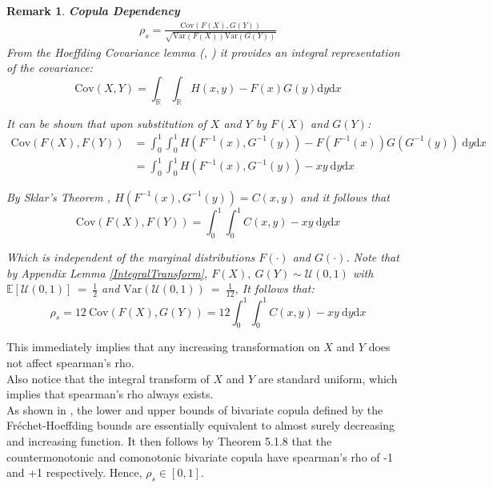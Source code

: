 \documentclass[12pt]{report}
\newtheorem{remark}{Remark}[section]
\newcommand{\1}{\mathbf{1}}
\begin{document}
\begin{remark}\label{SpearmanRhoCopulaDependency}\: \textbf{Copula Dependency}\\

\begin{align*}
\rho_{s} = \frac{\mathrm{Cov}(F(X),G(Y))}{\sqrt{\mathrm{Var}(F(X))\mathrm{Var}(G(Y))}}  
\end{align*}
From the Hoeffding Covariance lemma (\cite{höffding1940maßstabinvariante}, \cite{QRMMcNeil}) it provides an integral representation of the covariance: 
\begin{equation*}
\mathrm{Cov}(X,Y) = \int_{\mathbb{R}} \int_{\mathbb{R}} H(x,y) - F(x)G(y) \mathrm{d}y\mathrm{d}x 
\end{equation*}

It can be shown that upon substitution of $X$ and $Y$ by $F(X)$ and $G(Y)$: 
\begin{align*}
\mathrm{Cov}(F(X),F(Y)) &= \int_{0}^{1} \int_{0}^{1} H(F^{-1}(x),G^{-1}(y)) - F(F^{-1}(x))G(G^{-1}(y)) \: \mathrm{d}y\mathrm{d}x \\
&= \int_{0}^{1} \int_{0}^{1} H(F^{-1}(x),G^{-1}(y)) - xy \: \mathrm{d}y\mathrm{d}x
\end{align*}

By Sklar's Theorem \parencite{SklarTheorem}, $H(F^{-1}(x),G^{-1}(y)) = C(x,y)$ and it follows that 
\begin{equation*}
\mathrm{Cov}(F(X),F(Y)) = \int_{0}^{1} \int_{0}^{1} C(x,y) - xy \: \mathrm{d}y\mathrm{d}x
\end{equation*}

Which is independent of the marginal distributions $F(\cdot)$ and $G(\cdot)$. Note that by Appendix Lemma \ref{IntegralTransform}, $F(X), \: G(Y) \sim \mathcal{U}(0,1)$ with $\mathbb{E}[\mathcal{U}(0,1)] \: = \: \frac{1}{2}$ and $\mathrm{Var}(\mathcal{U}(0,1)) \: = \: \frac{1}{12}$, It follows that:
\begin{equation*}
\rho_{s} = 12 \: \mathrm{Cov}(F(X),G(Y)) = 12 \int_{0}^{1} \int_{0}^{1} C(x,y) - xy \: \mathrm{d}y\mathrm{d}x
\end{equation*}
\end{remark} 
This immediately implies that any increasing transformation on $X$ and $Y$ does not affect spearman's rho.\\
\vspace{0.5cm}
Also notice that the integral transform of $X$ and $Y$ are standard uniform, which implies that spearman's rho always exists.\\
\vspace{0.5cm}
As shown in \cite{HofertBook}, the lower and upper bounds of bivariate copula defined by the Fr{\'e}chet-Hoeffding bounds are essentially equivalent to almost surely decreasing and increasing function. It then follows by \cite{NelsenCopulabook2006} Theorem 5.1.8 that the countermonotonic and comonotonic bivariate copula have spearman's rho of -1 and +1 respectively. Hence, $\rho_{s} \in [0,1]$.
\end{document}
